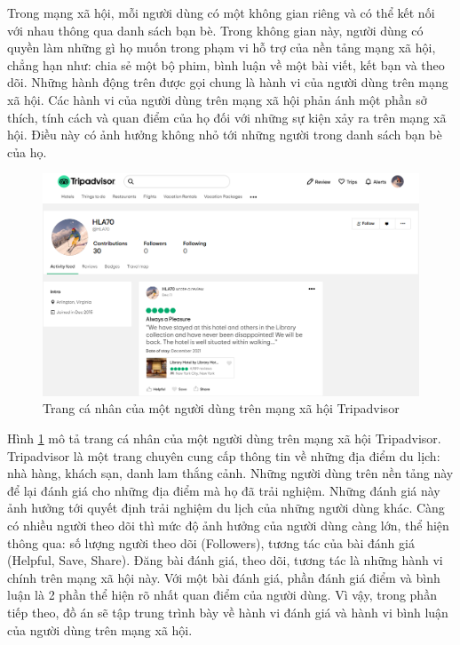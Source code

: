 Trong mạng xã hội, mỗi người dùng có một không gian riêng và có thể kết nối với
nhau thông qua danh sách bạn bè. Trong không gian này, người dùng có quyền làm
những gì họ muốn trong phạm vi hỗ trợ của nền tảng mạng xã hội, chẳng hạn như: chia
sẻ một bộ phim, bình luận về một bài viết, kết bạn và theo dõi. Những hành động trên
được gọi chung là hành vi của người dùng trên mạng xã hội. Các hành vi của người
dùng trên mạng xã hội phản ánh một phần sở thích, tính cách và quan điểm của họ đối
với những sự kiện xảy ra trên mạng xã hội. Điều này có ảnh hưởng không nhỏ tới những
người trong danh sách bạn bè của họ.
\begin{figure}[htbp]
    \centering
    \includegraphics[width=1\linewidth]{imgs/chapter_3/trip-advisor.png}
    \caption{Trang cá nhân của một người dùng trên mạng xã hội Tripadvisor}
    \label{trip-advisor}
\end{figure}
Hình \ref{trip-advisor} mô tả trang cá nhân của một người dùng trên mạng xã hội Tripadvisor.
Tripadvisor là một trang chuyên cung cấp thông tin về những địa điểm du lịch: nhà hàng,
khách sạn, danh lam thắng cảnh. Những người dùng trên nền tảng này để lại đánh giá
cho những địa điểm mà họ đã trải nghiệm. Những đánh giá này ảnh hưởng tới quyết
định trải nghiệm du lịch của những người dùng khác. Càng có nhiều người theo dõi thì
mức độ ảnh hưởng của người dùng càng lớn, thể hiện thông qua: số lượng người theo dõi (Followers), tương tác của bài đánh giá (Helpful, Save, Share). Đăng bài đánh giá,
theo dõi, tương tác là những hành vi chính trên mạng xã hội này. Với một bài đánh giá, phần đánh giá điểm và bình luận là 2 phần thể hiện rõ nhất
quan điểm của người dùng. Vì vậy, trong phần tiếp theo, đồ án sẽ tập trung trình bày về
hành vi đánh giá và hành vi bình luận của người dùng trên mạng xã hội.

